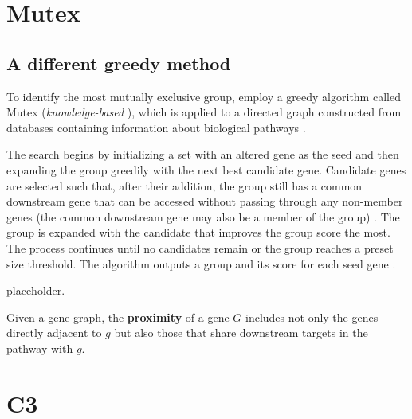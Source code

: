 \section{Mutex}

\subsection{A different greedy method}

To identify the most mutually exclusive group, \textcite{mutex} employ a greedy algorithm called Mutex (\textit{knowledge-based} \cite{survey}), which is applied to a directed graph constructed from databases containing information about biological pathways .

The search begins by initializing a set with an altered gene as the seed and then expanding the group greedily with the next best candidate gene. Candidate genes are selected such that, after their addition, the group still has a common downstream gene that can be accessed without passing through any non-member genes (the common downstream gene may also be a member of the group) . The group is expanded with the candidate that improves the group score the most. The process continues until no candidates remain or the group reaches a preset size threshold. The algorithm outputs a group and its score for each seed gene .

placeholder. 

\begin{definition}[Proximity]
    Given a gene graph, the \textbf{proximity} of a gene $G$ includes not only the genes directly adjacent to $g$ but also those that share downstream targets in the pathway with $g$. 
\end{definition}

\section{C3}

